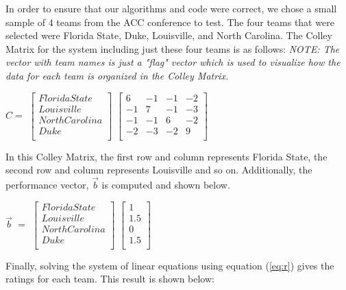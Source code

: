 \documentclass{article}
\begin{document}
In order to ensure that our algorithms and code were correct, we chose a small sample of 4 teams from the ACC conference to test. The four teams that were selected were Florida State, Duke, Louisville, and North Carolina. The Colley Matrix for the system including just these four teams is as follows:
\textit{NOTE: The vector with team names is just a "flag" vector which is used to visualize how the data for each team is organized in the Colley Matrix.}
\begin{center}
$C =$
$\begin{bmatrix}
Florida State\\
Louisville\\
North Carolina\\
Duke\\
\end{bmatrix}$
$\begin{bmatrix}
6&-1&-1&-2\\
-1&7&-1&-3\\
-1&-1&6&-2\\
-2&-3&-2&9\\
\end{bmatrix}$
\end{center}

In this Colley Matrix, the first row and column represents Florida State, the second row and column represents Louisville and so on. Additionally, the performance vector, $\vec{b}$ is computed and shown below.

\begin{center}
$\vec{b}$ $=$
$\begin{bmatrix}
Florida State\\
Louisville\\
North Carolina\\
Duke\\
\end{bmatrix}$
$\begin{bmatrix}
1\\
1.5\\
0\\
1.5\\
\end{bmatrix}$
\end{center}

Finally, solving the system of linear equations using equation (\ref{eq:r}) gives the ratings for each team. This result is shown below:
\end{document}
